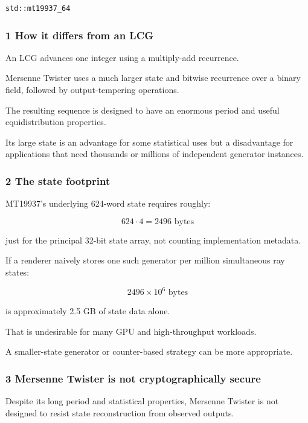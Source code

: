 \begin{verbatim}
std::mt19937_64
\end{verbatim}

\subsubsection{1 How it differs from an LCG}\label{02-foundations-ii-ch029-how-it-differs-from-an-lcg}

An LCG advances one integer using a multiply-add recurrence.

Mersenne Twister uses a much larger state and bitwise recurrence over a binary field, followed by output-tempering operations.

The resulting sequence is designed to have an enormous period and useful equidistribution properties.

Its large state is an advantage for some statistical uses but a disadvantage for applications that need thousands or millions of independent generator instances.

\subsubsection{2 The state footprint}\label{02-foundations-ii-ch029-the-state-footprint}

MT19937's underlying 624-word state requires roughly:

\[
 624\cdot4=2496\text{ bytes}
\]

just for the principal 32-bit state array, not counting implementation metadata.

If a renderer naively stores one such generator per million simultaneous ray states:

\[
 2496\times10^6\text{ bytes}
\]

is approximately 2.5 GB of state data alone.

That is undesirable for many GPU and high-throughput workloads.

A smaller-state generator or counter-based strategy can be more appropriate.

\subsubsection{3 Mersenne Twister is not cryptographically secure}\label{02-foundations-ii-ch029-mersenne-twister-is-not-cryptographically-secure}

Despite its long period and statistical properties, Mersenne Twister is not designed to resist state reconstruction from observed outputs.

